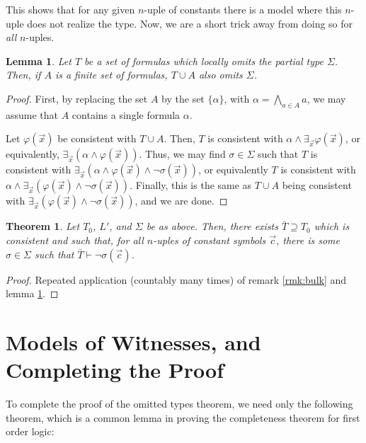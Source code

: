 \documentclass{article}
\newtheorem{theorem}{Theorem}
\newtheorem{lemma}{Lemma}
\theoremstyle{nonumberplain}
\newtheorem{proof}{Proof}
\begin{document}
This shows that for any given $n$-uple of constants there is a model where this $n$-uple does not realize the type. Now, we are a short trick away from doing so for \emph{all} $n$-uples.

\begin{lemma}\label{lemma:finomit}
Let $T$ be a set of formulas which locally omits the partial type $\Sigma$. Then, if $A$ is a finite set of formulas, $T \cup A$ also omits $\Sigma$.
\end{lemma}

\begin{proof}
First, by replacing the set $A$ by the set $\{\alpha\}$, with $\alpha = \bigwedge_{a \in A} a$, we may assume that $A$ contains a single formula $\alpha$.

Let $\varphi(\vec x)$ be consistent with $T \cup A$. Then, $T$ is consistent with $\alpha \land \exists_{\vec x} \varphi(\vec x)$, or equivalently, $\exists_{\vec x}(\alpha \land \varphi(\vec x))$. Thus, we may find $\sigma \in \Sigma$ such that $T$ is consistent with $\exists_{\vec x}(\alpha \land \varphi(\vec x) \land \neg \sigma(\vec x))$, or equivalently $T$ is consistent with $\alpha \land \exists_{\vec x}(\varphi(\vec x) \land \neg \sigma(\vec x))$. Finally, this is the same as $T \cup A$ being consistent with $\exists_{\vec x}(\varphi(\vec x) \land \neg \sigma(\vec x))$, and we are done.
\end{proof}

\begin{theorem}\label{thm:tbar}
Let $T_0$, $L'$, and $\Sigma$ be as above. Then, there exists $\bar T \supseteq T_0$ which is consistent and such that, for all $n$-uples of constant symbols $\vec c$, there is some $\sigma \in \Sigma$ such that $\bar T \vdash \neg \sigma(\vec c)$.
\end{theorem}

\begin{proof}
Repeated application (countably many times) of remark \ref{rmk:bulk} and lemma \ref{lemma:finomit}.
\end{proof}

\section{Models of Witnesses, and Completing the Proof}\label{sec:modelsofwitnesses}

To complete the proof of the omitted types theorem, we need only the following theorem, which is a common lemma in proving the completeness theorem for first order logic:
\end{document}
